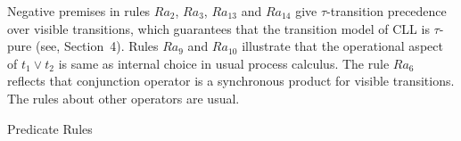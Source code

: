 \documentclass{elsarticle}
\theoremstyle{plain}
\theoremstyle{definition}
\begin{document}
Negative premises in rules $Ra_2$, $Ra_3$, $Ra_{13}$ and $Ra_{14}$ give $\tau$-transition precedence over visible transitions, which guarantees that the transition model of CLL is $\tau$-pure (see, Section~4).
Rules $Ra_9$ and $Ra_{10}$ illustrate that the operational aspect of $t_1\vee t_2$ is same as internal choice in usual process calculus.
The rule $Ra_6$ reflects that conjunction operator is a synchronous product for visible transitions.
The rules about other operators are usual.

\begin{table}[ht]
\begin{center}
\caption{Predicate Rules}\label{Ta:PREDICATIVE_RULES}
\end{center}
\end{table}
\end{document}
